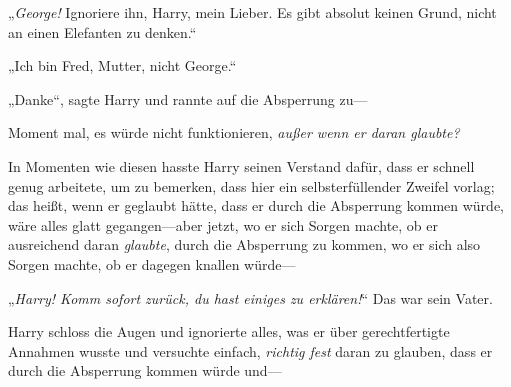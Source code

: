 „\emph{George!} Ignoriere ihn, Harry, mein Lieber. Es gibt absolut keinen Grund, nicht an einen Elefanten zu denken.“

„Ich bin Fred, Mutter, nicht George.“

„Danke“, sagte Harry und rannte auf die Absperrung zu—

Moment mal, es würde nicht funktionieren, \emph{außer wenn er daran glaubte?}

In Momenten wie diesen hasste Harry seinen Verstand dafür, dass er schnell genug arbeitete, um zu bemerken, dass hier ein selbsterfüllender Zweifel vorlag; das heißt, wenn er geglaubt hätte, dass er durch die Absperrung kommen würde, wäre alles glatt gegangen—aber jetzt, wo er sich Sorgen machte, ob er ausreichend daran \emph{glaubte}, durch die Absperrung zu kommen, wo er sich also Sorgen machte, ob er dagegen knallen würde—%

„\emph{Harry! Komm sofort zurück, du hast einiges zu erklären!}“ Das war sein Vater.

Harry schloss die Augen und ignorierte alles, was er über gerechtfertigte Annahmen wusste und versuchte einfach, \emph{richtig fest} daran zu glauben, dass er durch die Absperrung kommen würde und—


